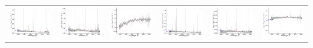 \begin{center}
\begin{longtable}{l l l l l l }
    \includegraphics[width=0.3\linewidth, clip]{Figs/Figs-sdss/spec-1089-52913-0386-STRIPE82-0006-034786.pdf} & \includegraphics[width=0.3\linewidth, clip]{Figs/Figs-sdss/spec-1090-52903-0539-STRIPE82-0006-015081.pdf} & \includegraphics[width=0.3\linewidth, clip]{Figs/Figs-sdss/spec-1101-52621-0223-SPLUS-s02s12-030410.pdf} & \includegraphics[width=0.3\linewidth, clip]{Figs/Figs-sdss/spec-1102-52883-0155-STRIPE82-0139-036676.pdf} & \includegraphics[width=0.3\linewidth, clip]{Figs/Figs-sdss/spec-1103-52873-0382-STRIPE82-0136-022276.pdf} & \includegraphics[width=0.3\linewidth, clip]{Figs/Figs-sdss/spec-1103-52873-0393-STRIPE82-0136-015923.pdf} \\

\end{longtable}
\end{center}
